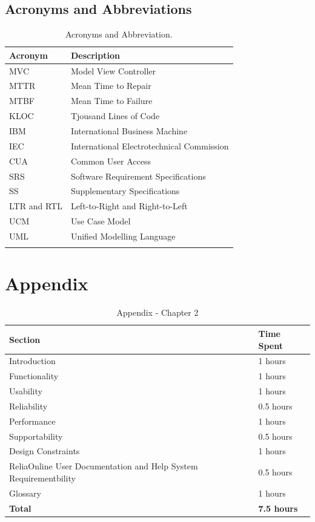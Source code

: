 \documentclass{report}
\begin{document}
\subsection{Acronyms and Abbreviations}
\begin{longtable}{|p{4.5cm}|p{6.5cm}|}\hline
    \textbf{Acronym} & \textbf{Description}  \\ \hline
    MVC & Model View Controller \\ \hline
    MTTR & Mean Time to Repair \\ \hline
    MTBF & Mean Time to Failure \\ \hline
    KLOC & Tjousand Lines of Code \\ \hline
    IBM & International Business Machine \\ \hline
    IEC & International Electrotechnical Commission \\ \hline
    CUA & Common User Access\\ \hline
    SRS & Software Requirement Specifications\\ \hline
    SS & Supplementary Specifications\\ \hline
    LTR and RTL & Left-to-Right and Right-to-Left\\ \hline
    UCM& Use Case Model\\ \hline
    UML& Unified Modelling Language\\ \hline
         \caption{Acronyms and Abbreviation.\label{long}}\\
\end{longtable}

\section{Appendix}
\begin{table}[htb!]
    \centering
    \begin{tabular}{|p{5.5cm}|p{6.5cm}|}\hline
    \textbf{Section} & \textbf{Time Spent} \\ \hline
    Introduction & 1 hours \\ \hline
    Functionality & 1 hours \\ \hline
    Usability & 1 hours \\ \hline
    Reliability & 0.5 hours \\ \hline
    Performance & 1 hours \\ \hline
    Supportability & 0.5 hours \\ \hline
    Design Constraints & 1 hours \\ \hline
    ReliaOnline User Documentation and Help System Requirementbility & 0.5 hours \\ \hline
    Glossary & 1 hours \\ \hline
    \textbf{Total} & \textbf{7.5 hours} \\ \hline
\end{tabular}
    \caption{Appendix - Chapter 2}
    \label{tab:my_label}
\end{table}
\end{document}
